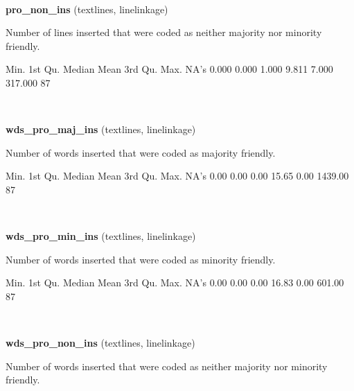 \documentclass[]{article}
\newenvironment{Shaded}{\begin{snugshade}}{\end{snugshade}}
\newcommand{\StringTok}[1]{\textcolor[rgb]{0.31,0.60,0.02}{{#1}}}
\newcommand{\NormalTok}[1]{{#1}}
\begin{document}
~

\vspace{1em}

\textbf{pro\_non\_ins} (textlines, linelinkage)

Number of lines inserted that were coded as neither majority nor
minority friendly.

\begin{Shaded}
\begin{Highlighting}[]
   \NormalTok{Min. 1st Qu.  Median    Mean 3rd Qu.    Max.    NA}\StringTok{'s }
\StringTok{  0.000   0.000   1.000   9.811   7.000 317.000      87 }
\end{Highlighting}
\end{Shaded}

~

\vspace{1em}

\textbf{wds\_pro\_maj\_ins} (textlines, linelinkage)

Number of words inserted that were coded as majority friendly.

\begin{Shaded}
\begin{Highlighting}[]
   \NormalTok{Min. 1st Qu.  Median    Mean 3rd Qu.    Max.    NA}\StringTok{'s }
\StringTok{   0.00    0.00    0.00   15.65    0.00 1439.00      87 }
\end{Highlighting}
\end{Shaded}

~

\vspace{1em}

\textbf{wds\_pro\_min\_ins} (textlines, linelinkage)

Number of words inserted that were coded as minority friendly.

\begin{Shaded}
\begin{Highlighting}[]
   \NormalTok{Min. 1st Qu.  Median    Mean 3rd Qu.    Max.    NA}\StringTok{'s }
\StringTok{   0.00    0.00    0.00   16.83    0.00  601.00      87 }
\end{Highlighting}
\end{Shaded}

~

\vspace{1em}

\textbf{wds\_pro\_non\_ins} (textlines, linelinkage)

Number of words inserted that were coded as neither majority nor
minority friendly.
\end{document}
